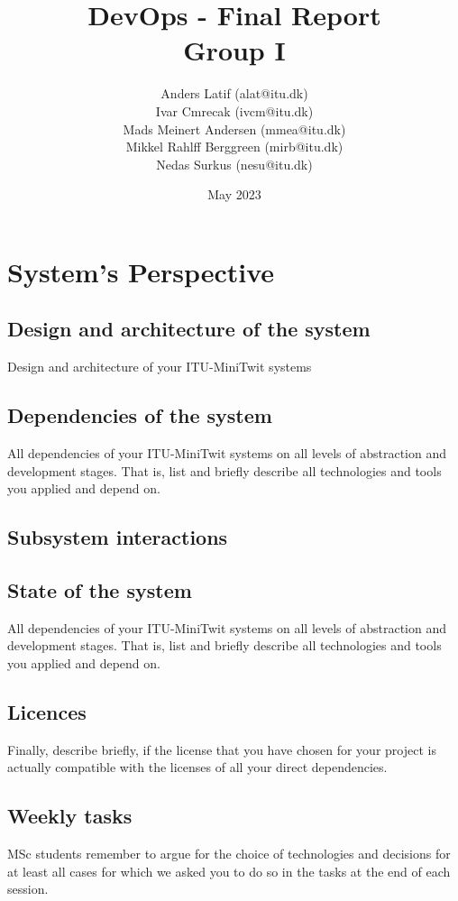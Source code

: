\documentclass{article}
\title{DevOps - Final Report\\
  \large Group I
}
\author{
Anders Latif (alat@itu.dk)\\
Ivar Cmrecak (ivcm@itu.dk)\\
Mads Meinert Andersen (mmea@itu.dk) \\
Mikkel Rahlff Berggreen (mirb@itu.dk)\\ 
Nedas Surkus (nesu@itu.dk)\\
}
\date{May 2023}
\begin{document}
\maketitle


\pagebreak


\section{System's Perspective} 



\subsection{Design and architecture of the system}

Design and architecture of your ITU-MiniTwit systems

\subsection{Dependencies of the system}
All dependencies of your ITU-MiniTwit systems on all levels of abstraction and development stages.
That is, list and briefly describe all technologies and tools you applied and depend on.
\subsection{Subsystem interactions}

\subsection{State of the system}

All dependencies of your ITU-MiniTwit systems on all levels of abstraction and development stages.
That is, list and briefly describe all technologies and tools you applied and depend on.

\subsection{Licences}
Finally, describe briefly, if the license that you have chosen for your project is actually compatible with the licenses of all your direct dependencies.

\subsection{Weekly tasks}
MSc students remember to argue for the choice of technologies and decisions for at least all cases for which we asked you to do so in the tasks at the end of each session.
\end{document}
